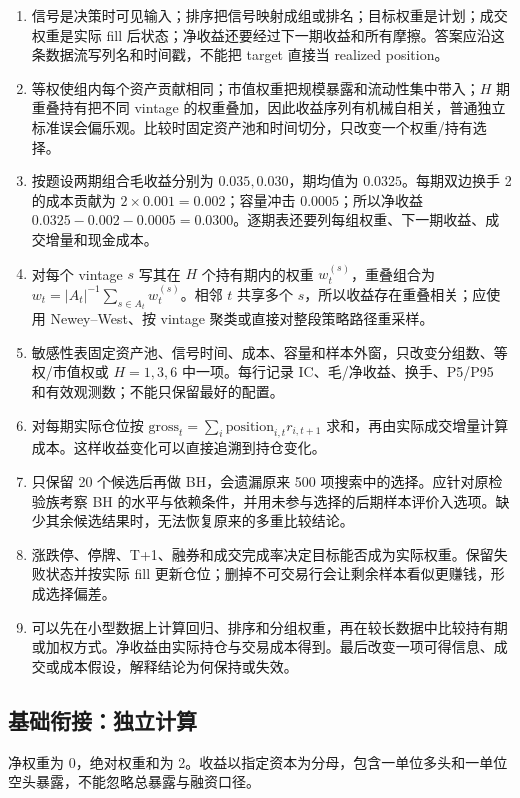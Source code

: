 
\begin{enumerate}[leftmargin=*]
  \item 信号是决策时可见输入；排序把信号映射成组或排名；目标权重是计划；成交权重是实际 fill 后状态；净收益还要经过下一期收益和所有摩擦。答案应沿这条数据流写列名和时间戳，不能把 target 直接当 realized position。
  \item 等权使组内每个资产贡献相同；市值权重把规模暴露和流动性集中带入；$H$ 期重叠持有把不同 vintage 的权重叠加，因此收益序列有机械自相关，普通独立标准误会偏乐观。比较时固定资产池和时间切分，只改变一个权重/持有选择。
  \item 按题设两期组合毛收益分别为 $0.035,0.030$，期均值为 $0.0325$。每期双边换手 2 的成本贡献为 $2\times0.001=0.002$；容量冲击 $0.0005$；所以净收益 $0.0325-0.002-0.0005=0.0300$。逐期表还要列每组权重、下一期收益、成交增量和现金成本。
  \item 对每个 vintage $s$ 写其在 $H$ 个持有期内的权重 $w_t^{(s)}$，重叠组合为 $w_t=|A_t|^{-1}\sum_{s\in A_t}w_t^{(s)}$。相邻 $t$ 共享多个 $s$，所以收益存在重叠相关；应使用 Newey--West、按 vintage 聚类或直接对整段策略路径重采样。
  \item 敏感性表固定资产池、信号时间、成本、容量和样本外窗，只改变分组数、等权/市值权或 $H=1,3,6$ 中一项。每行记录 IC、毛/净收益、换手、P5/P95 和有效观测数；不能只保留最好的配置。
  \item 对每期实际仓位按 $\mathrm{gross}_t=\sum_i\mathrm{position}_{i,t}r_{i,t+1}$ 求和，再由实际成交增量计算成本。这样收益变化可以直接追溯到持仓变化。
  \item 只保留 20 个候选后再做 BH，会遗漏原来 500 项搜索中的选择。应针对原检验族考察 BH 的水平与依赖条件，并用未参与选择的后期样本评价入选项。缺少其余候选结果时，无法恢复原来的多重比较结论。
  \item 涨跌停、停牌、T+1、融券和成交完成率决定目标能否成为实际权重。保留失败状态并按实际 fill 更新仓位；删掉不可交易行会让剩余样本看似更赚钱，形成选择偏差。
  \item 可以先在小型数据上计算回归、排序和分组权重，再在较长数据中比较持有期或加权方式。净收益由实际持仓与交易成本得到。最后改变一项可得信息、成交或成本假设，解释结论为何保持或失效。
\end{enumerate}

\subsection*{基础衔接：独立计算}
净权重为 0，绝对权重和为 2。收益以指定资本为分母，包含一单位多头和一单位空头暴露，不能忽略总暴露与融资口径。
